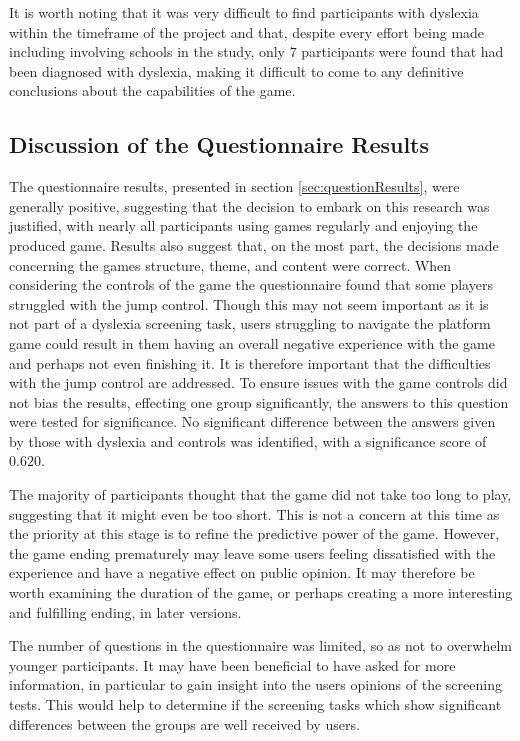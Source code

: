 \documentclass[journal]{IEEEtran}
\begin{document}
It is worth noting that it was very difficult to find participants with dyslexia within the timeframe of the project and that, despite every effort being made including involving schools in the study, only $7$ participants were found that had been diagnosed with dyslexia, making it difficult to come to any definitive conclusions about the capabilities of the game. 
 
\subsection{Discussion of the Questionnaire Results}
The questionnaire results, presented in section \ref{sec:questionResults}, were generally positive, suggesting that the decision to embark on this research was justified, with nearly all participants using games regularly and enjoying the produced game. Results also suggest that, on the most part, the decisions made concerning the games structure, theme, and content were correct. 
When considering the controls of the game the questionnaire found that some players struggled with the jump control. Though this may not seem important as it is not part of a dyslexia screening task, users struggling to navigate the platform game could result in them having an overall negative experience with the game and perhaps not even finishing it. It is therefore important that the difficulties with the jump control are addressed. To ensure issues with the game controls did not bias the results, effecting one group significantly, the answers to this question were tested for significance. No significant difference between the answers given by those with dyslexia and controls was identified, with a significance score of $0.620$. 

The majority of participants thought that the game did not take too long to play, suggesting that it might even be too short. This is not a concern at this time as the priority at this stage is to refine the predictive power of the game. However, the game ending prematurely may leave some users feeling dissatisfied with the experience and have a negative effect on public opinion. It may therefore be worth examining the duration of the game, or perhaps creating a more interesting and fulfilling ending, in later versions.

The number of questions in the questionnaire was limited, so as not to overwhelm younger participants. It may have been beneficial to have asked for more information, in particular to gain insight into the users opinions of the screening tests. This would help to determine if the screening tasks which show significant differences between the groups are well received by users.
 
\end{document}
